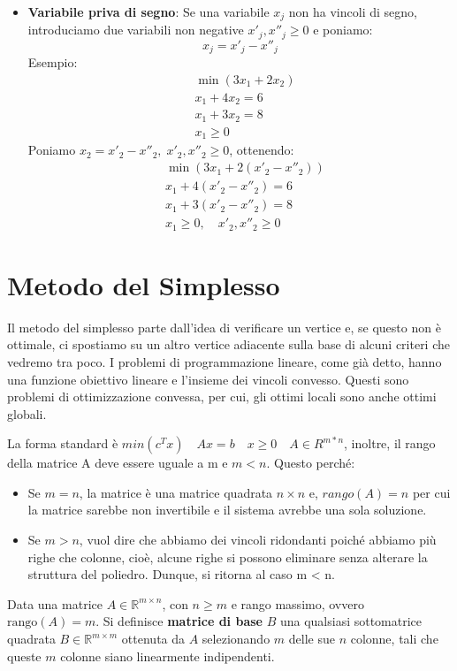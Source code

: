 \begin{itemize}
    \item \textbf{Variabile priva di segno}:  
    Se una variabile \( x_j \) non ha vincoli di segno, introduciamo due variabili non negative \( x'_j, x''_j \ge 0 \) e poniamo:
    \[
    x_j = x'_j - x''_j
    \]
    Esempio:
    \[
    \begin{aligned}
    &\min(3x_1 + 2x_2) \\
    &x_1 + 4x_2 = 6 \\
    &x_1 + 3x_2 = 8 \\
    &x_1 \ge 0
    \end{aligned}
    \]
    Poniamo \( x_2 = x'_2 - x''_2, \; x'_2, x''_2 \ge 0 \), ottenendo:
    \[
    \begin{aligned}
    &\min(3x_1 + 2(x'_2 - x''_2)) \\
    &x_1 + 4(x'_2 - x''_2) = 6 \\
    &x_1 + 3(x'_2 - x''_2) = 8 \\
    &x_1 \ge 0, \quad x'_2, x''_2 \ge 0
    \end{aligned}
    \]
\end{itemize}

\chapter{Metodo del Simplesso}
Il metodo del simplesso parte dall'idea di verificare un vertice e, se questo non è ottimale, ci spostiamo su un altro vertice adiacente sulla base di alcuni criteri che vedremo tra poco. I problemi di programmazione lineare, come già detto, hanno una funzione obiettivo lineare e l'insieme dei vincoli convesso. Questi sono problemi di ottimizzazione convessa, per cui, gli ottimi locali sono anche ottimi globali.

La forma standard è $min(c^Tx) \quad Ax = b \quad x\geq 0 \quad A \in R^{m * n}$, inoltre, il rango della matrice A deve essere uguale a m e $m<n$. Questo perché:
\begin{itemize}
    \item Se  $m = n$, la matrice è una matrice quadrata $n\times n$ e, $rango(A)=n$ per cui la matrice sarebbe non invertibile e il sistema avrebbe una sola soluzione.
    \item Se  $m > n$, vuol dire che abbiamo dei vincoli ridondanti poiché abbiamo più righe che colonne, cioè, alcune righe si possono eliminare senza alterare la struttura del poliedro. Dunque, si ritorna al caso m < n. 
\end{itemize}
Data una matrice $A \in \mathbb{R}^{m \times n}$, con $n \ge m$ e rango massimo, ovvero $\text{rango}(A) = m$.
Si definisce \textbf{matrice di base} $B$ una qualsiasi sottomatrice quadrata $B \in \mathbb{R}^{m \times m}$ ottenuta da $A$ selezionando $m$ delle sue $n$ colonne, tali che queste $m$ colonne siano linearmente indipendenti.

